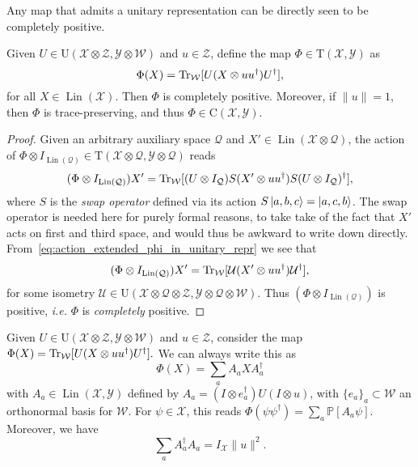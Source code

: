 \documentclass[12pt]{report}
\newcommand{\PP}{\mathbb{P}}
\newcommand{\calY}{{\mathcal{Y}}}
\newcommand{\calQ}{{\mathcal{Q}}}
\newcommand{\calU}{{\mathcal{U}}}
\newcommand{\calW}{{\mathcal{W}}}
\newcommand{\calX}{{\mathcal{X}}}
\newcommand{\calZ}{{\mathcal{Z}}}
\newcommand{\rmC}{{\mathrm{C}}}
\newcommand{\rmT}{{\mathrm{T}}}
\newcommand{\rmU}{{\mathrm{U}}}
\DeclareMathOperator{\Lin}{Lin}
\begin{document}
Any map that admits a unitary representation can be directly seen to be completely positive.

\begin{prop}
	Given $U\in\rmU(\calX\otimes\calZ,\calY\otimes\calW)$ and $u\in\calZ$, define the map $\Phi\in\rmT(\calX,\calY)$ as
	\begin{equation}
		\Phi(X) = \Tr_\calW[U(X\otimes uu^\dagger)U^\dagger],
	\end{equation}
	for all $X\in\Lin(\calX)$.
	Then $\Phi$ is completely positive.
	Moreover, if $\|u\|=1$, then $\Phi$ is trace-preserving, and thus $\Phi\in\rmC(\calX,\calY)$.
\end{prop}
\begin{proof}
	Given an arbitrary auxiliary space $\calQ$ and $X'\in\Lin(\calX\otimes\calQ)$, the action of
	$\Phi\otimes I_{\Lin(\calQ)}\in\rmT(\calX\otimes\calQ,\calY\otimes\calQ)$ reads
	\begin{equation}\label{eq:action_extended_phi_in_unitary_repr}
		(\Phi\otimes I_{\Lin(\calQ)})X'
		= \Tr_\calW[(U\otimes I_\calQ) S(X'\otimes uu^\dagger)S (U\otimes I_\calQ)^\dagger ],
	\end{equation}
	where $S$ is the \emph{swap operator} defined via its action
	$S\ket{a,b,c} = \ket{a,c,b}$.
	The swap operator is needed here for purely formal reasons, to take take of the fact that $X'$ acts on first and third space, and would thus be awkward to write down directly.
	From~\cref{eq:action_extended_phi_in_unitary_repr} we see that
	\begin{equation}
		(\Phi\otimes I_{\Lin(\calQ)})X' = \Tr_\calW[\calU (X'\otimes uu^\dagger)\calU^\dagger],
	\end{equation}
	for some isometry $\calU\in\rmU(\calX\otimes\calQ\otimes\calZ,\calY\otimes\calQ\otimes\calW)$.
	Thus $(\Phi\otimes I_{\Lin(\calQ)})$ is positive, \emph{i.e.} $\Phi$ is \emph{completely} positive.
\end{proof}

\begin{prop}
	Given $U\in\rmU(\calX\otimes\calZ,\calY\otimes\calW)$ and $u\in\calZ$, consider the map
		$\Phi(X) = \Tr_\calW[U(X\otimes uu^\dagger)U^\dagger].$
	We can always write this as
	\begin{equation}
		\Phi(X) = \sum_{a} A_a X A_a^\dagger
	\end{equation}
	with $A_a\in\Lin(\calX,\calY)$ defined by
	$A_a = (I \otimes e_a^\dagger)U(I \otimes u)$,
	with $\{e_a\}_a\subset\calW$ an orthonormal basis for $\calW$.
	For $\psi\in\calX$, this reads
	$\Phi(\psi\psi^\dagger) = \sum_a \PP[A_a \psi]$.
	Moreover, we have
	\begin{equation}
		\sum_a A_a^\dagger A_a = I_{\calX} \|u\|^2.
	\end{equation}
\end{prop}
\end{document}
